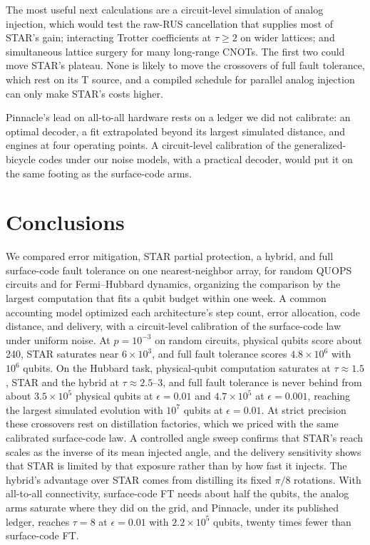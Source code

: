 \documentclass[11pt]{article}
\newcommand{\eps}{\epsilon}
\begin{document}
The most useful next calculations are a circuit-level simulation of analog
injection, which would test the raw-RUS cancellation that supplies most of
STAR's gain; interacting Trotter coefficients at $\tau\geq2$ on wider
lattices; and simultaneous lattice surgery for many long-range CNOTs. The first
two could move STAR's plateau. None is likely to move the crossovers of full
fault tolerance, which rest on its T source, and a compiled schedule for
parallel analog injection can only make STAR's costs higher.

Pinnacle's lead on all-to-all hardware rests on a ledger we did not calibrate:
an optimal decoder, a fit extrapolated beyond its largest simulated distance,
and engines at four operating points. A circuit-level calibration of the
generalized-bicycle codes under our noise models, with a practical decoder,
would put it on the same footing as the surface-code arms.

\section{Conclusions}\label{sec:conclusions}
We compared error mitigation, STAR partial protection, a hybrid, and full
surface-code fault tolerance on one nearest-neighbor array, for random QUOPS
circuits and for Fermi--Hubbard dynamics, organizing the comparison by the
largest computation that fits a qubit budget within one week. A common accounting model
optimized each architecture's step count, error allocation, code distance,
and delivery, with a circuit-level calibration of the surface-code law under
uniform noise. At $p=10^{-3}$ on random circuits, physical qubits score about
240, STAR saturates near $6\times10^3$, and full fault tolerance scores
$4.8\times10^6$ with $10^6$ qubits. On the Hubbard task, physical-qubit computation
saturates at $\tau\approx1.5$, STAR and the hybrid at $\tau\approx2.5$--3, and full
fault tolerance is never behind from about $3.5\times10^5$ physical qubits at
$\eps=0.01$ and $4.7\times10^5$ at $\eps=0.001$, reaching the largest simulated
evolution with $10^7$ qubits at $\eps=0.01$. At strict precision these crossovers rest on distillation
factories, which we priced with the same calibrated surface-code law. A
controlled angle sweep confirms that STAR's reach scales as the inverse of its
mean injected angle, and the delivery sensitivity shows that STAR is limited by
that exposure rather than by how fast it injects. The hybrid's advantage over
STAR comes from distilling its fixed $\pi/8$ rotations. With all-to-all
connectivity, surface-code FT needs about half the qubits, the analog arms
saturate where they did on the grid, and Pinnacle, under its published ledger,
reaches $\tau=8$ at $\eps=0.01$ with $2.2\times10^5$ qubits, twenty times
fewer than surface-code FT.
\end{document}
